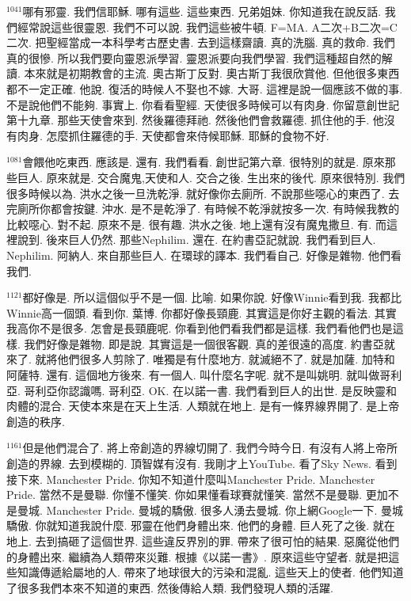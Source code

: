 \documentclass{book}
\begin{document}
$^{1041}$哪有邪靈.
我們信耶穌.
哪有這些.
這些東西.
兄弟姐妹.
你知道我在說反話.
我們經常說這些很靈恩.
我們不可以說.
我們這些被牛頓.
F=MA.
A二次+B二次=C二次.
把聖經當成一本科學考古歷史書.
去到這樣齋讀.
真的洗腦.
真的救命.
我們真的很慘.
所以我們要向靈恩派學習.
靈恩派要向我們學習.
我們這種超自然的解讀.
本來就是初期教會的主流.
奧古斯丁反對.
奧古斯丁我很欣賞他.
但他很多東西都不一定正確.
他說.
復活的時候人不娶也不嫁.
大哥.
這裡是說一個應該不做的事.
不是說他們不能夠.
事實上.
你看看聖經.
天使很多時候可以有肉身.
你留意創世記第十九章.
那些天使會來到.
然後羅德拜祂.
然後他們會救羅德.
抓住他的手.
他沒有肉身.
怎麼抓住羅德的手.
天使都會來侍候耶穌.
耶穌的食物不好.

$^{1081}$會餵他吃東西.
應該是.
還有.
我們看看.
創世記第六章.
很特別的就是.
原來那些巨人.
原來就是.
交合魔鬼,天使和人.
交合之後.
生出來的後代.
原來很特別.
我們很多時候以為.
洪水之後一旦洗乾淨.
就好像你去廁所.
不說那些噁心的東西了.
去完廁所你都會按鍵.
沖水.
是不是乾淨了.
有時候不乾淨就按多一次.
有時候我教的比較噁心.
對不起.
原來不是.
很有趣.
洪水之後.
地上還有沒有魔鬼撒旦.
有.
而這裡說到.
後來巨人仍然.
那些Nephilim.
還在.
在約書亞記就說.
我們看到巨人.
Nephilim.
阿納人.
來自那些巨人.
在環球的譯本.
我們看自己.
好像是雜物.
他們看我們.

$^{1121}$都好像是.
所以這個似乎不是一個.
比喻.
如果你說.
好像Winnie看到我.
我都比Winnie高一個頭.
看到你.
葉博.
你都好像長頸鹿.
其實這是你好主觀的看法.
其實我高你不是很多.
怎會是長頸鹿呢.
你看到他們看我們都是這樣.
我們看他們也是這樣.
我們好像是雜物.
即是說.
其實這是一個很客觀.
真的差很遠的高度.
約書亞就來了.
就將他們很多人剪除了.
唯獨是有什麼地方.
就滅絕不了.
就是加薩.
加特和阿薩特.
還有.
這個地方後來.
有一個人.
叫什麼名字呢.
就不是叫姚明.
就叫做哥利亞.
哥利亞你認識嗎.
哥利亞.
OK.
在以諾一書.
我們看到巨人的出世.
是反映靈和肉體的混合.
天使本來是在天上生活.
人類就在地上.
是有一條界線界開了.
是上帝創造的秩序.

$^{1161}$但是他們混合了.
將上帝創造的界線切開了.
我們今時今日.
有沒有人將上帝所創造的界線.
去到模糊的.
頂智媒有沒有.
我剛才上YouTube.
看了Sky News.
看到接下來.
Manchester Pride.
你知不知道什麼叫Manchester Pride.
Manchester Pride.
當然不是曼聯.
你懂不懂笑.
你如果懂看球賽就懂笑.
當然不是曼聯.
更加不是曼城.
Manchester Pride.
曼城的驕傲.
很多人湧去曼城.
你上網Google一下.
曼城驕傲.
你就知道我說什麼.
邪靈在他們身體出來.
他們的身體.
巨人死了之後.
就在地上.
去到搞砸了這個世界.
這些違反界別的罪.
帶來了很可怕的結果.
惡魔從他們的身體出來.
繼續為人類帶來災難.
根據《以諾一書》.
原來這些守望者.
就是把這些知識傳遞給屬地的人.
帶來了地球很大的污染和混亂.
這些天上的使者.
他們知道了很多我們本來不知道的東西.
然後傳給人類.
我們發現人類的活躍.
\end{document}
